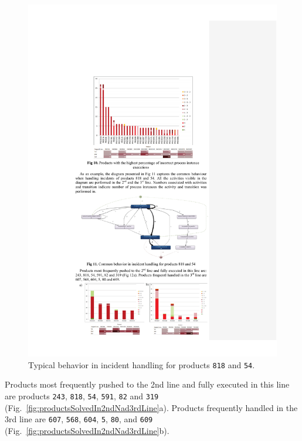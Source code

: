 \documentclass[lnbip]{svmultln}
\begin{document}
\begin{figure}
\centering
\includegraphics[width=.9\textwidth]{"figs/pic 13"}
\caption{Typical behavior in incident handling for products \texttt{818} and \texttt{54}.}
\label{fig:products818And54Processed}
\end{figure}


Products most frequently pushed to the 2nd line and fully executed in this line are products \texttt{243}, \texttt{818}, \texttt{54}, \texttt{591}, \texttt{82} and \texttt{319} (Fig.~\ref{fig:productsSolvedIn2ndNad3rdLine}a). Products frequently handled in the 3rd line are \texttt{607}, \texttt{568}, \texttt{604}, \texttt{5}, \texttt{80}, and \texttt{609} (Fig.~\ref{fig:productsSolvedIn2ndNad3rdLine}b). 
\end{document}
